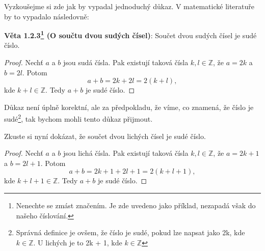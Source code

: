 \begin{example}
  Vyzkoušejme si zde jak by vypadal jednoduchý důkaz. V matematické literatuře by to vypadalo následovně:

  \vspace{0.3cm}

  \noindent\textbf{Věta 1.2.3\footnote{Nenechte se zmást značením. Je zde uvedeno jako příklad, nezapadá však do našeho číslování.} (O součtu dvou sudých čísel)}: Součet dvou sudých čísel je sudé číslo.

  \begin{proof}
    Nechť $a$ a $b$ jsou sudá čísla. Pak existují taková čísla $k, l \in \mathbb{Z}$, že $a = 2k$ a $b = 2l$. Potom
    \begin{equation}
      a + b = 2k + 2l = 2(k + l),
    \end{equation}
    kde $k + l \in \mathbb{Z}$. Tedy $a + b$ je sudé číslo.
  \end{proof}
  
  Důkaz není úplně korektní, ale za předpokladu, že víme, co znamená, že číslo je sudé\footnote{Správná definice je ovšem, že číslo je sudé, pokud lze napsat jako 2k, kde $k\in\mathbb{Z}$. U lichých je to 2k + 1, kde $k\in\mathbb{Z}$}, tak bychom mohli tento důkaz přijmout.
\end{example}

\begin{problem}
  Zkuste si nyní dokázat, že součet dvou lichých čísel je sudé číslo.
\end{problem}

\begin{solution}

  \begin{proof}
    Nechť $a$ a $b$ jsou lichá čísla. Pak existují taková čísla $k, l \in \mathbb{Z}$, že $a = 2k + 1$ a $b = 2l + 1$. Potom
    \begin{equation}
      a + b = 2k + 1 + 2l + 1 = 2(k + l + 1),
    \end{equation}
    kde $k + l + 1 \in \mathbb{Z}$. Tedy $a + b$ je sudé číslo.
  \end{proof}
\end{solution}


